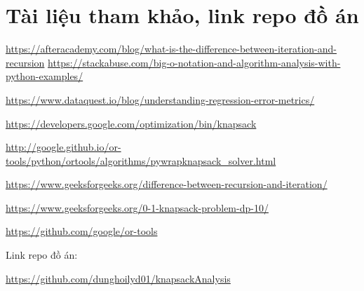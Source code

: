 \documentclass[12pt,a4paper]{report}
\begin{document}
    \chapter{Tài liệu tham khảo, link repo đồ án}
    \url{https://afteracademy.com/blog/what-is-the-difference-between-iteration-and-recursion}
    \url{https://stackabuse.com/big-o-notation-and-algorithm-analysis-with-python-examples/}
    
    \url{https://www.dataquest.io/blog/understanding-regression-error-metrics/}
    
    \url{https://developers.google.com/optimization/bin/knapsack}

    \url{http://google.github.io/or-tools/python/ortools/algorithms/pywrapknapsack_solver.html}
    
    \url{https://www.geeksforgeeks.org/difference-between-recursion-and-iteration/}
    
    \url{https://www.geeksforgeeks.org/0-1-knapsack-problem-dp-10/}

    \url{https://github.com/google/or-tools}

    Link repo đồ án:

    \url{https://github.com/dunghoilyd01/knapsackAnalysis}
\end{document}
